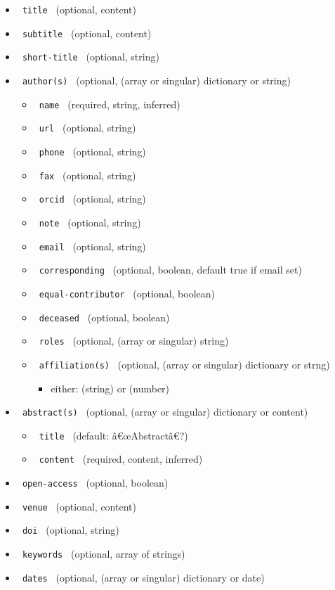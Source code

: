 \begin{itemize}
\tightlist
\item
  \texttt{\ title\ } (optional, content)
\item
  \texttt{\ subtitle\ } (optional, content)
\item
  \texttt{\ short-title\ } (optional, string)
\item
  \texttt{\ author(s)\ } (optional, (array or singular) dictionary or
  string)

  \begin{itemize}
  \tightlist
  \item
    \texttt{\ name\ } (required, string, inferred)
  \item
    \texttt{\ url\ } (optional, string)
  \item
    \texttt{\ phone\ } (optional, string)
  \item
    \texttt{\ fax\ } (optional, string)
  \item
    \texttt{\ orcid\ } (optional, string)
  \item
    \texttt{\ note\ } (optional, string)
  \item
    \texttt{\ email\ } (optional, string)
  \item
    \texttt{\ corresponding\ } (optional, boolean, default true if email
    set)
  \item
    \texttt{\ equal-contributor\ } (optional, boolean)
  \item
    \texttt{\ deceased\ } (optional, boolean)
  \item
    \texttt{\ roles\ } (optional, (array or singular) string)
  \item
    \texttt{\ affiliation(s)\ } (optional, (array or singular)
    dictionary or strng)

    \begin{itemize}
    \tightlist
    \item
      either: (string) or (number)
    \end{itemize}
  \end{itemize}
\item
  \texttt{\ abstract(s)\ } (optional, (array or singular) dictionary or
  content)

  \begin{itemize}
  \tightlist
  \item
    \texttt{\ title\ } (default: â€œAbstractâ€?)
  \item
    \texttt{\ content\ } (required, content, inferred)
  \end{itemize}
\item
  \texttt{\ open-access\ } (optional, boolean)
\item
  \texttt{\ venue\ } (optional, content)
\item
  \texttt{\ doi\ } (optional, string)
\item
  \texttt{\ keywords\ } (optional, array of strings)
\item
  \texttt{\ dates\ } (optional, (array or singular) dictionary or date)


\end{itemize}
